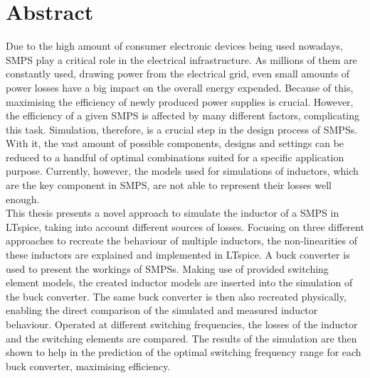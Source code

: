 
\chapter*{Abstract}   \label{cha:Abstract}
Due to the high amount of consumer electronic devices being used nowadays, \ac{SMPS} play a critical role in the electrical infrastructure. As millions of them are constantly used, drawing power from the electrical grid, even small amounts of power losses have a big impact on the overall energy expended. Because of this, maximising the efficiency of newly produced power supplies is crucial. However, the efficiency of a given \ac{SMPS} is affected by many different factors, complicating this task. Simulation, therefore, is a crucial step in the design process of \acp{SMPS}. With it, the vast amount of possible components, designs and settings can be reduced to a handful of optimal combinations suited for a specific application purpose. Currently, however, the models used for simulations of inductors, which are the key component in \ac{SMPS}, are not able to represent their losses well enough.\\
This thesis presents a novel approach to simulate the inductor of a \ac{SMPS} in LTspice, taking into account different sources of losses. Focusing on three different approaches to recreate the behaviour of multiple inductors, the non-linearities of these inductors are explained and implemented in LTspice. A buck converter is used to present the workings of \acp{SMPS}. Making use of provided switching element models, the created inductor models are inserted into the simulation of the buck converter. The same buck converter is then also recreated physically, enabling the direct comparison of the simulated and measured inductor behaviour. Operated at different switching frequencies, the losses of the inductor and the switching elements are compared. The results of the simulation are then shown to help in the prediction of the optimal switching frequency range for each buck converter, maximising efficiency.
